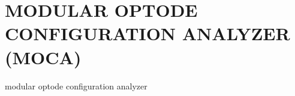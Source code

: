 
\chapter{MODULAR OPTODE CONFIGURATION ANALYZER (MOCA)} %
modular optode configuration analyzer
\label{chap:moca}



